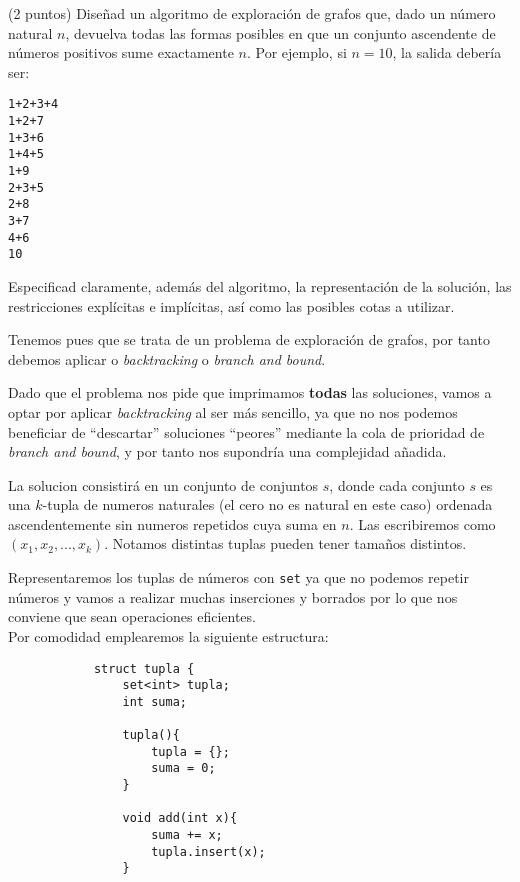 \documentclass[12pt]{article}
\begin{document}
    \begin{ejercicio}
        (2 puntos) Diseñad un algoritmo de exploración de grafos que, 
        dado un número natural $n$, devuelva
        todas las formas posibles en que un conjunto ascendente de 
        números positivos sume exactamente $n$.
        Por ejemplo, si $n = 10$, la salida debería ser:
        \begin{verbatim}
1+2+3+4
1+2+7
1+3+6
1+4+5
1+9
2+3+5
2+8
3+7
4+6
10
        \end{verbatim}
        Especificad claramente, además del algoritmo, 
        la representación de la solución, las restricciones
        explícitas e implícitas, así como las posibles cotas a utilizar.

        Tenemos pues que se trata de un problema de exploración de 
        grafos, por tanto debemos aplicar o \textit{backtracking}
        o \textit{branch and bound}.

        Dado que el problema nos pide que imprimamos \textbf{todas}
        las soluciones, vamos a optar por aplicar \textit{backtracking}
        al ser más sencillo, ya que no nos podemos beneficiar 
        de ``descartar'' soluciones ``peores'' mediante la cola de 
        prioridad de \textit{branch and bound}, y por tanto nos supondría
        una complejidad añadida.

        La solucion consistirá en un conjunto de conjuntos $s$, 
        donde cada conjunto $s$ es una $k$-tupla de numeros naturales 
        (el cero no es natural en este caso) ordenada ascendentemente 
        sin numeros repetidos cuya suma en $n$. Las 
        escribiremos como $(x_1,x_2,...,x_k)$. Notamos distintas 
        tuplas pueden tener tamaños distintos.

        Representaremos los tuplas de números con \verb|set|
        ya que no podemos repetir números y vamos a realizar muchas 
        inserciones y borrados por lo que nos conviene que sean 
        operaciones eficientes.\\
        Por comodidad emplearemos la siguiente estructura:
        \begin{lstlisting}
            struct tupla {
                set<int> tupla;
                int suma;

                tupla(){
                    tupla = {};
                    suma = 0;
                }

                void add(int x){
                    suma += x;
                    tupla.insert(x);
                }


\end{lstlisting}
\end{ejercicio}
\end{document}
